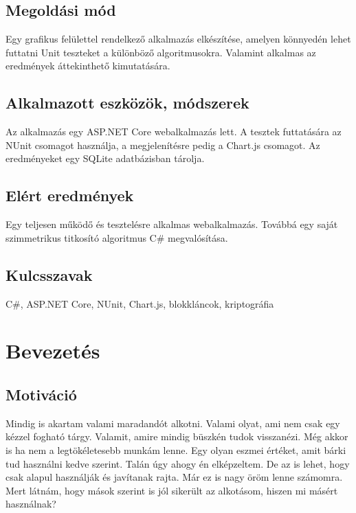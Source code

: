 \documentclass[12pt]{report} %
\begin{document}
\section*{Megoldási mód} %

Egy grafikus felülettel rendelkező alkalmazás elkészítése, amelyen könnyedén lehet futtatni Unit teszteket a különböző algoritmusokra. Valamint alkalmas az eredmények áttekinthető kimutatására.

\section*{Alkalmazott eszközök, módszerek} %

Az alkalmazás egy ASP.NET Core webalkalmazás lett. A tesztek futtatására az NUnit csomagot használja, a megjelenítésre pedig a Chart.js csomagot. Az eredményeket egy SQLite adatbázisban tárolja.

\section*{Elért eredmények} %

Egy teljesen működő és tesztelésre alkalmas webalkalmazás. Továbbá egy saját szimmetrikus titkosító algoritmus C\# megvalósítása.

\section*{Kulcsszavak} %

C\#, ASP.NET Core, NUnit, Chart.js, blokkláncok, kriptográfia

\chapter{Bevezetés} %

\section{Motiváció} %

Mindig is akartam valami maradandót alkotni. Valami olyat, ami nem csak egy kézzel fogható tárgy. Valamit, amire mindig büszkén tudok visszanézi. Még akkor is ha nem a legtökéletesebb munkám lenne. Egy olyan eszmei értéket, amit bárki tud használni kedve szerint. Talán úgy ahogy én elképzeltem. De az is lehet, hogy csak alapul használják és javítanak rajta. Már ez is nagy öröm lenne számomra. Mert látnám, hogy mások szerint is jól sikerült az alkotásom, hiszen mi másért használnak?
\end{document}
